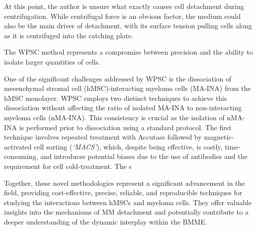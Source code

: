 At this point, the author is unsure what exactly causes cell detachment during
centrifugation. While centrifugal force is an obvious factor, the medium could
also be the main driver of detachment, with its surface tension pulling
cells along as it is centrifuged into the catching plate.


The WPSC method represents a compromise between precision and the ability to
isolate larger quantities of cells. 


One of the significant challenges addressed by WPSC is the dissociation of
mesenchymal stromal cell (hMSC)-interacting myeloma cells (MA-INA) from the hMSC
monolayer. WPSC employs two distinct techniques to achieve this dissociation
without affecting the ratio of isolated MA-INA to non-interacting myeloma cells
(nMA-INA). This consistency is crucial as the isolation of nMA-INA is performed
prior to dissociation using a standard protocol. The first technique involves
repeated treatment with Accutase followed by magnetic-activated cell sorting
(\emph{`MACS'}), which, despite being effective, is costly, time-consuming, and
introduces potential biases due to the use of antibodies and the requirement for
cell cold-treatment. The s






Together, these novel methodologies represent a significant advancement in the
field, providing cost-effective, precise, reliable, and reproducible techniques
for studying the interactions between \acp{hMSC} and myeloma cells. They offer
valuable insights into the mechanisms of MM detachment and potentially
contribute to a deeper understanding of the dynamic interplay within the BMME.




